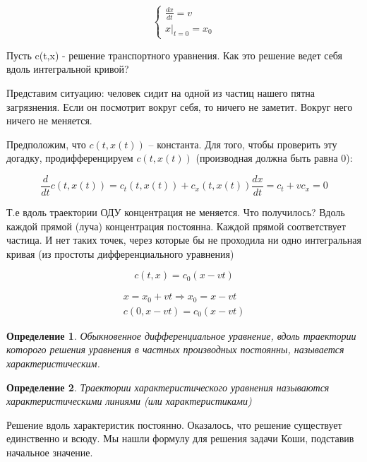 \documentclass[12pt]{report}
\newtheorem{definition}{Определение}
\begin{document}
\begin{equation}
    \begin{cases}
        \frac{dx}{dt} = v
        \\
        x \vert_{t=0} = x_0
    \end{cases}
\end{equation}
    
Пусть c(t,x) - решение транспортного уравнения. Как это решение ведет себя вдоль интегральной кривой? 
    
Представим ситуацию: человек сидит на одной из частиц нашего пятна загрязнения. Если он посмотрит вокруг себя, то ничего не заметит. Вокруг него ничего не меняется. 
    
Предположим, что $c(t,x(t))$ -- константа. Для того, чтобы проверить эту догадку, продифференцируем $c(t,x(t))$ (производная должна быть равна 0):
    
$$\frac{d}{dt}c(t,x(t)) = c_t(t,x(t)) + c_x(t,x(t))\frac{dx}{dt} = c_t + vc_x = 0$$
    
Т.е вдоль траектории ОДУ концентрация не меняется. Что получилось? Вдоль каждой прямой (луча) концентрация постоянна. Каждой прямой соответствует частица. И нет таких точек, через которые бы не проходила ни одно интегральная кривая (из простоты дифференциального уравнения)
    
\begin{equation} 
    c(t,x) = c_0(x-vt)    
\end{equation}
    
$$
    \begin{gathered}
        x = x_0 + vt \Longrightarrow x_0 = x - vt
        \\
        c(0, x - vt) = c_0(x - vt)
    \end{gathered}
$$

\begin{definition}
    Обыкновенное дифференциальное уравнение, вдоль траектории которого решения уравнения в частных производных постоянны, называется характеристическим. 
\end{definition}

\begin{definition}
    Траектории характеристического уравнения называются характеристическими линиями (или характеристиками)
\end{definition}

Решение вдоль характеристик постоянно. Оказалось, что решение существует единственно и всюду. Мы нашли формулу для решения задачи Коши, подставив начальное значение.
\end{document}
